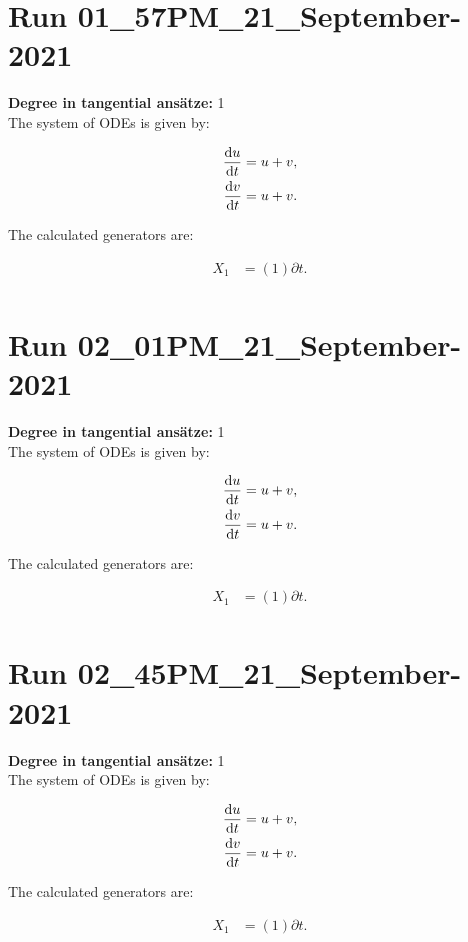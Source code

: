 \section*{Run 01\_57PM\_21\_September-2021}
\textbf{Degree in tangential ansätze:}	1\\
The system of ODEs is given by:

\begin{align*}
\dv{u}{t}&=u + v,\\
\dv{v}{t}&=u + v.\\
\end{align*}

\noindent The calculated generators are:

\begin{align*}
X_{1}&=\left( 1 \right)\partial t.\\
\end{align*}
\section*{Run 02\_01PM\_21\_September-2021}
\textbf{Degree in tangential ansätze:}	1\\
The system of ODEs is given by:

\begin{align*}
\dv{u}{t}&=u + v,\\
\dv{v}{t}&=u + v.\\
\end{align*}

\noindent The calculated generators are:

\begin{align*}
X_{1}&=\left( 1 \right)\partial t.\\
\end{align*}
\section*{Run 02\_45PM\_21\_September-2021}
\textbf{Degree in tangential ansätze:}	1\\
The system of ODEs is given by:

\begin{align*}
\dv{u}{t}&=u + v,\\
\dv{v}{t}&=u + v.\\
\end{align*}

\noindent The calculated generators are:

\begin{align*}
X_{1}&=\left( 1 \right)\partial t.\\
\end{align*}
